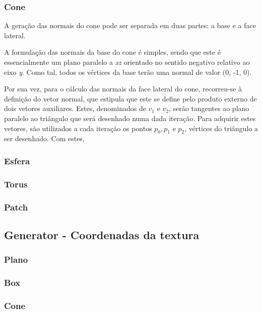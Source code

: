 \documentclass[a4paper]{article}
\begin{document}
\subsubsection{Cone}%

\hspace{3mm} A geração das normais do cone pode ser separada em duas partes: a base e a face lateral. 

A formulação das normais da base do cone é simples, sendo que este é essencialmente um plano paralelo a \textit{xz} orientado no sentido negativo relativo ao eixo \textit{y}. Como tal, todos os vértices da base terão uma normal de valor (0, -1, 0).

Por sua vez, para o cálculo das normais da face lateral do cone, recorreu-se à definição do vetor normal, que estipula que este se define pelo produto externo de dois vetores auxiliares. Estes, denominados de $v_1$ e $v_2$, serão tangentes ao plano paralelo ao triângulo que será desenhado numa dada iteração. Para adquirir estes vetores, são utilizados a cada iteração os pontos $p_0, p_1$ e $p_2$, vértices do triângulo a ser desenhado. Com estes, %

\subsubsection{Esfera}%
\subsubsection{Torus} %
\subsubsection{Patch}%

\subsection{Generator - Coordenadas da textura} 

\subsubsection{Plano}
\subsubsection{Box}
\subsubsection{Cone}
\end{document}
